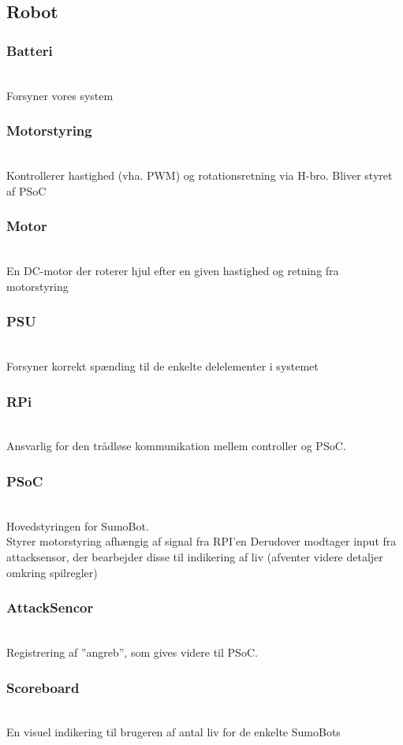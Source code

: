 \subsection{Robot}


\subsubsection*{\textbf{Batteri}}\hfill\\
Forsyner vores system
\subsubsection*{\textbf{Motorstyring}}\hfill\\
Kontrollerer hastighed (vha. PWM) og rotationsretning via H-bro. Bliver styret af PSoC
\subsubsection*{\textbf{Motor}}\hfill\\
En DC-motor der roterer hjul efter en given hastighed og retning fra motorstyring
\subsubsection*{\textbf{PSU}}\hfill\\
Forsyner korrekt spænding til de enkelte delelementer i systemet
\subsubsection*{\textbf{RPi}}\hfill\\
Ansvarlig for den trådløse kommunikation mellem controller og PSoC.
\subsubsection*{\textbf{PSoC}}\hfill\\
Hovedstyringen for SumoBot. \\
Styrer motorstyring afhængig af signal fra RPI’en
Derudover modtager input fra attacksensor, der bearbejder disse til indikering af liv (afventer videre detaljer omkring spilregler)
\subsubsection*{\textbf{AttackSencor}}\hfill\\
Registrering af ”angreb”, som gives videre til PSoC.
\subsubsection*{\textbf{Scoreboard}}\hfill\\
En visuel indikering til brugeren af antal liv for de enkelte SumoBots